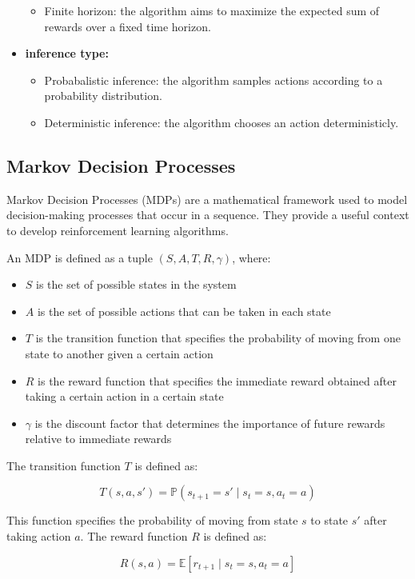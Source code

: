 \begin{minipage}{\textwidth}
\begin{itemize}
\begin{itemize}
    \item Finite horizon: the algorithm aims to maximize the expected sum of rewards over a fixed time horizon.
    \end{itemize}
    \item \textbf{inference type:}
    \begin{itemize}
    \item Probabalistic inference: the algorithm samples actions according to a probability distribution.
    \item Deterministic inference: the algorithm chooses an action deterministicly.
    \end{itemize}
    \end{itemize}
\end{minipage}

\subsection{Markov Decision Processes}
Markov Decision Processes (MDPs) are a mathematical framework used to model decision-making processes that occur in a sequence. They provide a useful 
context to develop reinforcement learning algorithms.

An MDP is defined as a tuple $(S, A, T, R, \gamma)$, where:
\begin{itemize}
    \item $S$ is the set of possible states in the system
    \item $A$ is the set of possible actions that can be taken in each state
    \item $T$ is the transition function that specifies the probability of moving from one state to another given a certain action
    \item $R$ is the reward function that specifies the immediate reward obtained after taking a certain action in a certain state
    \item $\gamma$ is the discount factor that determines the importance of future rewards relative to immediate rewards
\end{itemize}

The transition function $T$ is defined as:

$$T(s, a, s') = \mathbb{P}(s_{t+1}=s' \mid s_t=s, a_t=a)$$

This function specifies the probability of moving from state $s$ to state $s'$ after taking action $a$. The reward function $R$ is defined as:

$$R(s, a) = \mathbb{E}[r_{t+1} \mid s_t=s, a_t=a]$$

